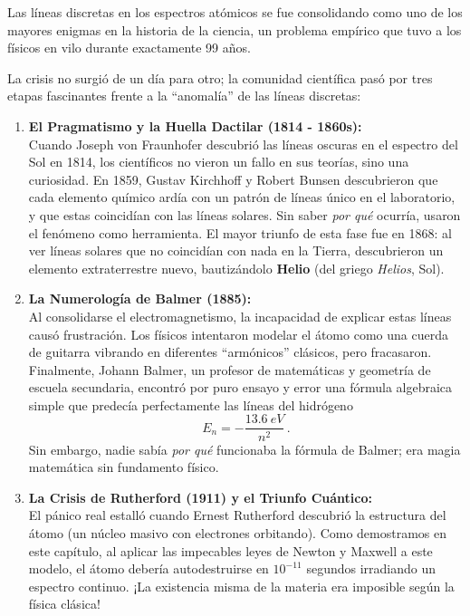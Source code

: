 \documentclass[11pt,a4paper]{book}
\begin{document}
\begin{tcolorbox}[breakable,colback=blue!5!white,colframe=blue!75!black,title=\textbf{Cápsula Histórica: Un Siglo de Magia sin Física}]

Las líneas discretas en los espectros atómicos se fue consolidando como uno de los mayores enigmas en la historia de la ciencia, un problema empírico que tuvo a los físicos en vilo durante exactamente 99 años. 

La crisis no surgió de un día para otro; la comunidad científica pasó por tres etapas fascinantes frente a la ``anomalía'' de las líneas discretas:

\begin{enumerate}
    \item \textbf{El Pragmatismo y la Huella Dactilar (1814 - 1860s):}\\
    Cuando Joseph von Fraunhofer descubrió las líneas oscuras en el espectro del Sol en 1814, los científicos no vieron un fallo en sus teorías, sino una curiosidad. En 1859, Gustav Kirchhoff y Robert Bunsen descubrieron que cada elemento químico ardía con un patrón de líneas único en el laboratorio, y que estas coincidían con las líneas solares. Sin saber \textit{por qué} ocurría, usaron el fenómeno como herramienta. El mayor triunfo de esta fase fue en 1868: al ver líneas solares que no coincidían con nada en la Tierra, descubrieron un elemento extraterrestre nuevo, bautizándolo \textbf{Helio} (del griego \textit{Helios}, Sol).

    \item \textbf{La Numerología de Balmer (1885):}\\
    Al consolidarse el electromagnetismo, la incapacidad de explicar estas líneas causó frustración. Los físicos intentaron modelar el átomo como una cuerda de guitarra vibrando en diferentes ``armónicos'' clásicos, pero fracasaron. Finalmente, Johann Balmer, un profesor de matemáticas y geometría de escuela secundaria, encontró por puro ensayo y error una fórmula algebraica simple que predecía perfectamente las líneas del hidrógeno
    \begin{equation}
        E_n = -\frac{\qty{13.6}{eV}}{n^2}\,.
    \end{equation}
    Sin embargo, nadie sabía \textit{por qué} funcionaba la fórmula de Balmer; era magia matemática sin fundamento físico.

    \item \textbf{La Crisis de Rutherford (1911) y el Triunfo Cuántico:}\\
    El pánico real estalló cuando Ernest Rutherford descubrió la estructura del átomo (un núcleo masivo con electrones orbitando). Como demostramos en este capítulo, al aplicar las impecables leyes de Newton y Maxwell a este modelo, el átomo debería autodestruirse en $10^{-11}$ segundos irradiando un espectro continuo. ¡La existencia misma de la materia era imposible según la física clásica!
\end{enumerate}


\end{tcolorbox}
\end{document}
